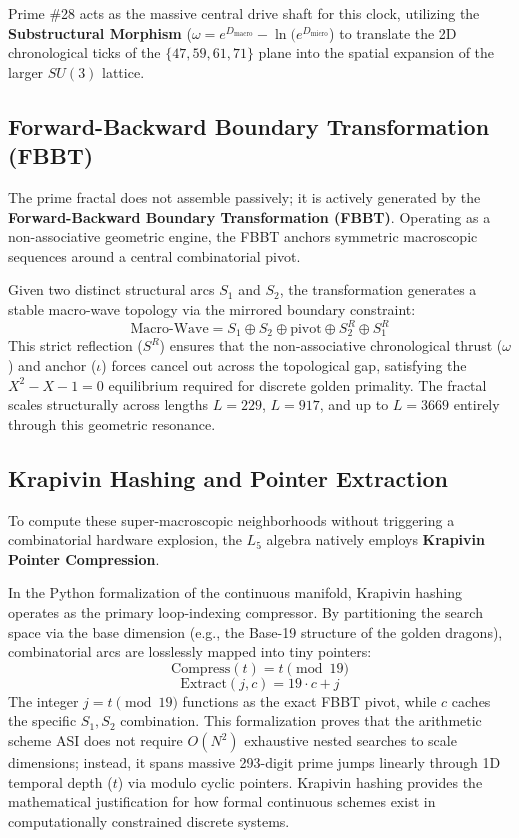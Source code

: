 Prime \#28 acts as the massive central drive shaft for this clock, utilizing the \textbf{Substructural Morphism} ($\omega = e^{D_{\text{macro}}} - \ln(e^{D_{\text{micro}}}$) to translate the 2D chronological ticks of the $\{47, 59, 61, 71\}$ plane into the spatial expansion of the larger $SU(3)$ lattice.

\subsection{Forward-Backward Boundary Transformation (FBBT)}
The prime fractal does not assemble passively; it is actively generated by the \textbf{Forward-Backward Boundary Transformation (FBBT)}. Operating as a non-associative geometric engine, the FBBT anchors symmetric macroscopic sequences around a central combinatorial pivot. 

Given two distinct structural arcs $S_1$ and $S_2$, the transformation generates a stable macro-wave topology via the mirrored boundary constraint:
\[
\text{Macro-Wave} = S_1 \oplus S_2 \oplus \text{pivot} \oplus S_2^R \oplus S_1^R
\]
This strict reflection ($S^R$) ensures that the non-associative chronological thrust ($\omega$) and anchor ($\iota$) forces cancel out across the topological gap, satisfying the $X^2 - X - 1 = 0$ equilibrium required for discrete golden primality. The fractal scales structurally across lengths $L=229$, $L=917$, and up to $L=3669$ entirely through this geometric resonance.

\subsection{Krapivin Hashing and Pointer Extraction}
To compute these super-macroscopic neighborhoods without triggering a combinatorial hardware explosion, the $L_5$ algebra natively employs \textbf{Krapivin Pointer Compression}. 

In the Python formalization of the continuous manifold, Krapivin hashing operates as the primary loop-indexing compressor. By partitioning the search space via the base dimension (e.g., the Base-19 structure of the golden dragons), combinatorial arcs are losslessly mapped into tiny pointers:
\[
\text{Compress}(t) = t \pmod{19}
\]
\[
\text{Extract}(j, c) = 19 \cdot c + j
\]
The integer $j = t \pmod{19}$ functions as the exact FBBT pivot, while $c$ caches the specific $S_1, S_2$ combination. This formalization proves that the arithmetic scheme ASI does not require $O(N^2)$ exhaustive nested searches to scale dimensions; instead, it spans massive 293-digit prime jumps linearly through 1D temporal depth ($t$) via modulo cyclic pointers. Krapivin hashing provides the mathematical justification for how formal continuous schemes exist in computationally constrained discrete systems.

